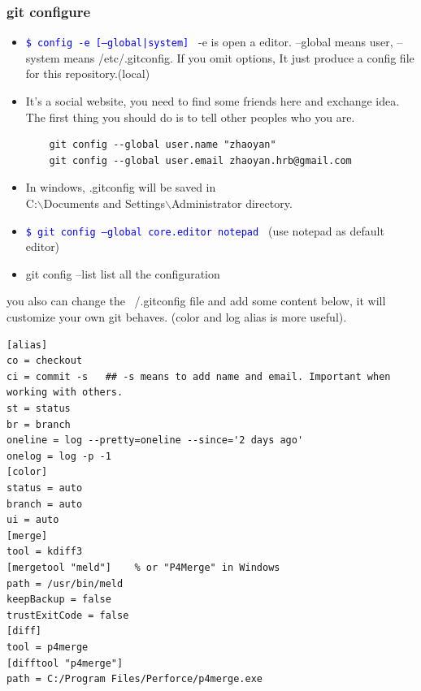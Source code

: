 \documentclass[a4paper,12pt,twoside]{book}
\newcommand{\linuxcommand}[1]{\texttt{\textcolor{blue}{\$ #1 \Pisymbol{psy}{191}}}}
\begin{document}
\subsubsection{ git configure}
    \begin{itemize}

  \item \linuxcommand{config -e [--global|system]}  -e is open a editor. --global means user, --system means
      /etc/.gitconfig.   If you omit options, It just produce a config file for this repository.(local)

\item It's a social website, you need to find some friends here and exchange idea. The first thing you should do is to tell other peoples who you are.  
    \begin{verbatim}
	git config --global user.name "zhaoyan"
	git config --global user.email zhaoyan.hrb@gmail.com
	\end{verbatim}

    \item In windows, .gitconfig will be saved in  \\
    C:$\backslash$Documents and Settings$\backslash$Administrator directory.
    \item \linuxcommand{git config --global core.editor notepad} (use notepad as default editor)
    \item git config --list list all the configuration
    \end{itemize}

you also can change the ~/.gitconfig file and add some content below, it will customize your own git behaves. (color and log
alias is more useful).

\begin{verbatim}
[alias]
co = checkout
ci = commit -s   ## -s means to add name and email. Important when working with others.
st = status
br = branch
oneline = log --pretty=oneline --since='2 days ago'
onelog = log -p -1
[color]
status = auto
branch = auto
ui = auto
[merge]
tool = kdiff3
[mergetool "meld"]    % or "P4Merge" in Windows
path = /usr/bin/meld
keepBackup = false
trustExitCode = false	
[diff]
tool = p4merge
[difftool "p4merge"]
path = C:/Program Files/Perforce/p4merge.exe
\end{verbatim}
\end{document}
